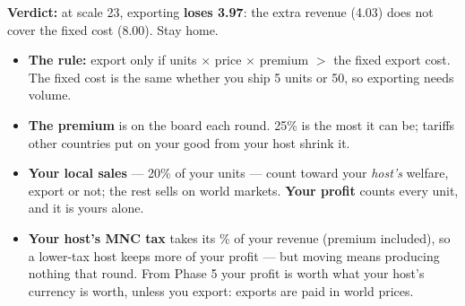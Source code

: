 \documentclass[11pt]{article}
\begin{document}
\textbf{Verdict:} at scale 23, exporting \textbf{loses 3.97}: the extra revenue (4.03) does not cover the fixed cost (8.00). Stay home.

\vspace{4pt}
\begin{itemize}[nosep,leftmargin=1.2em]
  \item \textbf{The rule:} export only if units $\times$ price $\times$ premium
    $>$ the fixed export cost. The fixed cost is the same whether you ship 5 units
    or 50, so exporting needs volume.
  \item \textbf{The premium} is on the board each round. 25\% is the most it
    can be; tariffs other countries put on your good from your host shrink it.
  \item \textbf{Your local sales} --- 20\% of your units --- count toward your
    \emph{host's} welfare, export or not; the rest sells on world markets.
    \textbf{Your profit} counts every unit, and it is yours alone.
  \item \textbf{Your host's MNC tax} takes its \% of your revenue (premium
    included), so a lower-tax host keeps more of your profit --- but moving
    means producing nothing that round. From Phase 5 your profit is worth what
    your host's currency is worth, unless you export: exports are paid in world
    prices.
\end{itemize}
\end{document}
